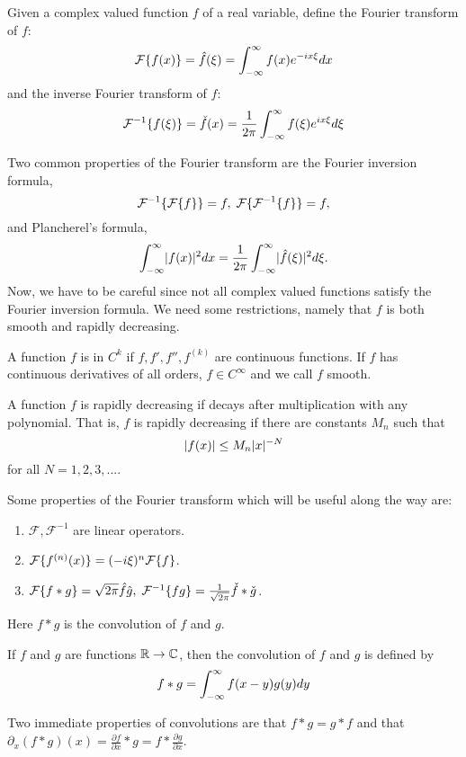 \begin{definition}
	Given a complex valued function $f$ of a real variable, define the Fourier transform of $f$:
	\[
	\mathcal{F}\{f(x)\} = \hat{f}(\xi) = \int_{-\infty}^\infty f(x)e^{-ix\xi}dx
	\]
	and the inverse Fourier transform of $f$:
	\[
	\mathcal{F}^{-1}\{f(\xi)\} = \check{f}(x) = \frac{1}{2\pi}\int_{-\infty}^\infty f(\xi)e^{ix\xi}d\xi
	\]
\end{definition}
Two common properties of the Fourier transform are the Fourier inversion formula,
\[
\mathcal{F}^{-1}\{\mathcal{F}\{f\}\} = f, \; \mathcal{F}\{\mathcal{F}^{-1}\{f\}\} = f,
\]
and Plancherel's formula,
\[
\int_{-\infty}^\infty \lvert f(x)\rvert^2 dx = \frac{1}{2\pi} \int_{-\infty}^\infty \lvert\hat{f}(\xi)\rvert^2 d\xi.
\]
Now, we have to be careful since not all complex valued functions satisfy the Fourier inversion formula. We need some restrictions, namely that $f$ is both smooth and rapidly decreasing.
\begin{definition}
	A function $f$ is in $C^k$ if $f, f', f'', f^{(k)}$ are continuous functions. If $f$ has continuous derivatives of all orders, $f \in C^\infty$ and we call $f$ smooth.
\end{definition}
\begin{definition}
	A function $f$ is rapidly decreasing if decays after multiplication with any polynomial.
	That is, $f$ is rapidly decreasing if there are constants $M_n$ such that
	\[
		\lvert f(x)\rvert \leq M_n \lvert x\rvert^{-N}
	\]
	for all $N = 1, 2, 3, ...$.
\end{definition}
Some properties of the Fourier transform which will be useful along the way are:
\begin{enumerate}
	\item \label{linear} $\mathcal{F}, \mathcal{F}^{-1}$ are linear operators.
	\item \label{derivatives} $\mathcal{F}\{f^{(n)}(x)\} = (-i\xi)^n \mathcal{F}\{f\}$.
	\item \label{convolution} $\mathcal{F}\{f \ast g\} = \sqrt{2\pi}\hat{f}\hat{g}, \; \mathcal{F}^{-1}\{fg\} = \frac{1}{\sqrt{2\pi}}\check{f}\ast\check{g}$.
\end{enumerate}
Here $f \ast g$ is the convolution of $f$ and $g$.

\begin{definition} If $f$ and $g$ are functions $\mathbb{R} \to \mathbb{C}$, then the convolution of $f$ and $g$ is defined by
	\[
		f \ast g = \int_{-\infty}^\infty f(x-y)g(y)dy
	\]
\end{definition}
Two immediate properties of convolutions are that $f \ast g = g \ast f$ and that \newline $\partial_x(f \ast g)(x) = \frac{\partial f}{\partial x} \ast g = f \ast \frac{\partial g}{\partial x}$.
\\

